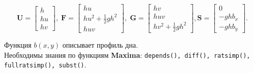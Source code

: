 	\begin{equation}
		\mathbf{U} =
		\begin{bmatrix}
			h \\
			h u \\
			h v
		\end{bmatrix}, \;
		\mathbf{F} =
		\begin{bmatrix}
			h u \\
			h u^{2} + \frac{1}{2} g h^{2} \\
			h u v
		\end{bmatrix}, \;
		\mathbf{G} =
		\begin{bmatrix}
			h v \\
			h u v \\
			h v^{2} + \frac{1}{2} g h^{2}
		\end{bmatrix},
		\mathbf{S} =
		\begin{bmatrix}
			0 \\
			-g h b_{x} \\
			-g h b_{y}
		\end{bmatrix}.
	\end{equation}
	
	Функция $b \left( x, y \right)$ описывает профиль дна.\\
	
	Необходимы знания по функциям \textbf{Maxima}: {\tt depends(), diff(), ratsimp(), fullratsimp(), subst()}.

	\newpage
